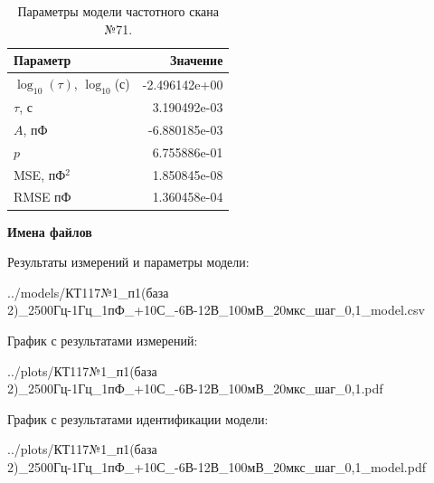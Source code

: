 \begin{table}[!ht]
    \centering
    \caption{Параметры модели частотного скана №71.}
    \begin{tabular}{|l|r|}
        \hline
        Параметр                                       & Значение                  \\ \hline
        $\log_{10}(\tau)$, $\log_{10}$(с)              & -2.496142e+00             \\ \hline
        $\tau$, с                                      & 3.190492e-03              \\ \hline
        $A$, пФ                                        & -6.880185e-03             \\ \hline
        $p$                                            & 6.755886e-01              \\ \hline
        MSE, пФ$^2$                                    & 1.850845e-08              \\ \hline
        RMSE пФ                                        & 1.360458e-04              \\ \hline
    \end{tabular}
    \label{table:frequency_scan_model_71}
\end{table}

\textbf{Имена файлов}

Результаты измерений и параметры модели:

\scriptsize../models/КТ117№1\_п1(база 2)\_2500Гц-1Гц\_1пФ\_+10С\_-6В-12В\_100мВ\_20мкс\_шаг\_0,1\_model.csv
\normalsize

График с результатами измерений:

\scriptsize../plots/КТ117№1\_п1(база 2)\_2500Гц-1Гц\_1пФ\_+10С\_-6В-12В\_100мВ\_20мкс\_шаг\_0,1.pdf
\normalsize

График с результатами идентификации модели:

\scriptsize../plots/КТ117№1\_п1(база 2)\_2500Гц-1Гц\_1пФ\_+10С\_-6В-12В\_100мВ\_20мкс\_шаг\_0,1\_model.pdf
\normalsize

